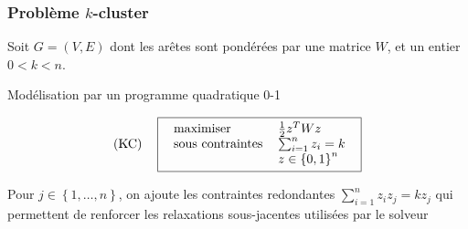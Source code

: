 \documentclass{beamer}
\newcommand{\set}[1]{\left\{ #1 \right\}}
\begin{document}
\begin{frame}
\frametitle{Problème $k$-cluster}

Soit $G=(V,E)$ dont les arêtes sont pondérées par une matrice $W$, et un entier $0<k<n$.


\begin{block}{Modélisation par un programme quadratique 0-1}

\[
\begin{tabular}{ll}
$(\text{KC})$ &
\fbox{
	\begin{tabular}{lll}
	maximiser 	& $\frac{1}{2} z^T W z$ \\
	sous contraintes 	& $\sum_{i=1}^n z_i = k$\\
				& $z \in \set{0,1}^n$
	\end{tabular}
}
\end{tabular}
\]

Pour $j \in \set{1,\ldots,n}$, on ajoute les contraintes redondantes $\sum_{i=1}^n z_i z_j = k z_j$ qui permettent de renforcer les relaxations sous-jacentes utilisées par le solveur

\end{block}


\end{frame}
\end{document}
